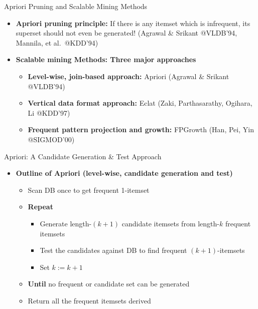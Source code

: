 \documentclass[aspectratio=169, 11pt]{beamer}
\begin{document}
\begin{frame}{Apriori Pruning and Scalable Mining Methods}
    \begin{itemize}
        \item \textbf{Apriori pruning principle:} If there is any itemset which is infrequent, its superset should not even be generated! (Agrawal \& Srikant @VLDB'94, Mannila, et al.\ @KDD'94)
        \vspace{3mm}
        \item \textbf{Scalable mining Methods: Three major approaches}
        \begin{itemize}
            \item \textbf{Level-wise, join-based approach:} Apriori (Agrawal \& Srikant @VLDB'94)
            \item \textbf{Vertical data format approach:} Eclat (Zaki, Parthasarathy, Ogihara, Li @KDD'97)
            \item \textbf{Frequent pattern projection and growth:} FPGrowth (Han, Pei, Yin @SIGMOD'00)
        \end{itemize}
    \end{itemize}
\end{frame}

\begin{frame}{Apriori: A Candidate Generation \& Test Approach}
    \begin{itemize}
        \item \textbf{Outline of Apriori (level-wise, candidate generation and test)}
        \begin{itemize}
            \item Scan DB once to get frequent 1-itemset
            \item \textbf{Repeat}
            \begin{itemize}
                \item Generate length-$(k+1)$ candidate itemsets from length-$k$ frequent itemsets
                \item Test the candidates against DB to find frequent $(k+1)$-itemsets
                \item Set $k := k + 1$
            \end{itemize}
            \item \textbf{Until} no frequent or candidate set can be generated
            \item Return all the frequent itemsets derived
        \end{itemize}
    \end{itemize}
\end{frame}
\end{document}
